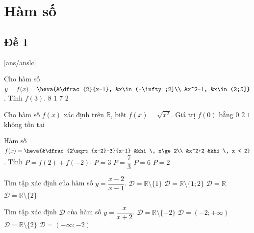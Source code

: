 \section{Hàm số}

\subsection{Đề 1}
\caulc
{}[ans/anslc]
\begin{ex}%
	Cho hàm số $y=f(x)=\heva{&\dfrac{2}{x-1}, &x\in(-\infty;2]\\ &x^2-1, &x\in(2;5]}$. Tính $f(3)$.
	\choice
	{\True $8$}
	{$1$}
	{$7$}
	{$2$}
\end{ex}

\begin{ex}%
	Cho hàm số $f(x)$ xác định trên $\mathbb{R}$, biết $f(x)=\sqrt{x^2}$. Giá trị $f(0)$ bằng
	\choice
	{\True $0$}
	{$2$}
	{$1$}
	{không tồn tại}
\end{ex}

\begin{ex}%
	Hàm số $f(x)=\heva{&\dfrac{2\sqrt{x-2}-3}{x-1} &khi \, x\ge 2\\ &x^2+2 &khi \, x < 2}$. Tính $P=f(2)+f(-2)$.
	\choice
	{\True $P=3$}
	{$P=\dfrac{7}{3}$}
	{$P=6$}
	{$P=2$}
\end{ex}

\begin{ex}%
	Tìm tập xác định của hàm số $y=\dfrac{x-2}{x-1}$.
	\choice
	{\True $\mathscr{D}=\mathbb{R} \setminus \{1\}$}
	{$\mathscr{D}=\mathbb{R} \setminus \{1;2\}$}
	{$\mathscr{D}=\mathbb{R}$}
	{$\mathscr{D}=\mathbb{R} \setminus \{2\}$}
\end{ex}

\begin{ex}%
	Tìm tập xác định $\mathscr{D}$ của hàm số $y=\dfrac{x}{x+2}$.
	\choice
	{\True $\mathscr{D}=\mathbb{R} \setminus \{-2\}$}
	{$\mathscr{D}=(-2;+\infty)$}
	{$\mathscr{D}=\mathbb{R} \setminus \{2\}$}
	{$\mathscr{D}=(-\infty;-2)$}
\end{ex}

